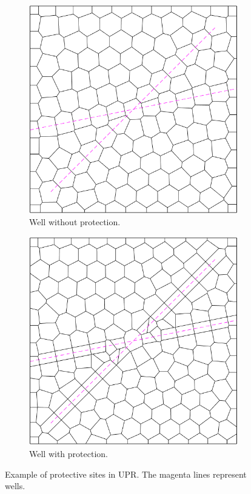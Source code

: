 \begin{figure}[ht]
    \centering
    \begin{subfigure}[b]{0.32\textwidth}
        \centering
        \includegraphics[width=\textwidth]{report/Images/Software/UPR protection/UPR_well.png}
        \caption{Well without protection.}
        \label{fig:upr-prot1}
    \end{subfigure}
    \quad
    \begin{subfigure}[b]{0.32\textwidth}
        \centering
        \includegraphics[width=\textwidth]{report/Images/Software/UPR protection/UPR_well_protLayer.png}
        \caption{Well with protection.}
        \label{fig:upr-prot2}
    \end{subfigure}
    \caption{Example of protective sites in UPR. The magenta lines represent wells.}
    \label{fig:upr-protective}
\end{figure}
